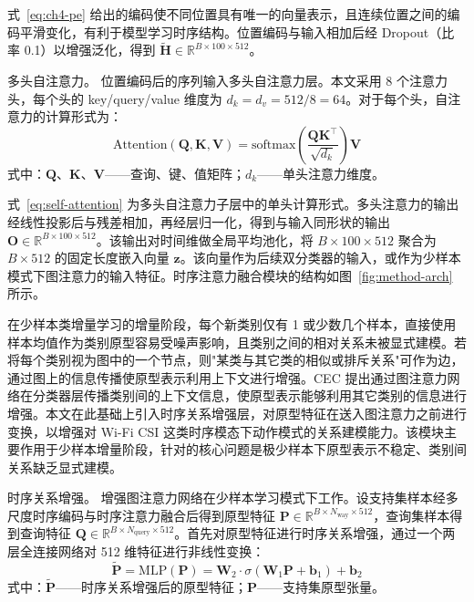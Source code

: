 式~\eqref{eq:ch4-pe} 给出的编码使不同位置具有唯一的向量表示，且连续位置之间的编码平滑变化，有利于模型学习时序结构。位置编码与输入相加后经 Dropout（比率 0.1）以增强泛化，得到 $\tilde{\mathbf{H}} \in \mathbb{R}^{B \times 100 \times 512}$。

多头自注意力。 位置编码后的序列输入多头自注意力层。本文采用 8 个注意力头，每个头的 key/query/value 维度为 $d_k = d_v = 512/8 = 64$。对于每个头，自注意力的计算形式为：
\begin{equation}\label{eq:self-attention}
  \mathrm{Attention}(\mathbf{Q}, \mathbf{K}, \mathbf{V}) = \mathrm{softmax}\left(\frac{\mathbf{Q}\mathbf{K}^\top}{\sqrt{d_k}}\right)\mathbf{V}
\end{equation}
\noindent 式中：$\mathbf{Q}$、$\mathbf{K}$、$\mathbf{V}$——查询、键、值矩阵；$d_k$——单头注意力维度。

式~\eqref{eq:self-attention} 为多头自注意力子层中的单头计算形式。多头注意力的输出经线性投影后与残差相加，再经层归一化，得到与输入同形状的输出 $\mathbf{O} \in \mathbb{R}^{B \times 100 \times 512}$。该输出对时间维做全局平均池化，将 $B \times 100 \times 512$ 聚合为 $B \times 512$ 的固定长度嵌入向量 $\mathbf{z}$。该向量作为后续双分类器的输入，或作为少样本模式下图注意力的输入特征。时序注意力融合模块的结构如图~\ref{fig:method-arch} 所示。


在少样本类增量学习的增量阶段，每个新类别仅有 1 或少数几个样本，直接使用样本均值作为类别原型容易受噪声影响，且类别之间的相对关系未被显式建模。若将每个类别视为图中的一个节点，则"某类与其它类的相似或排斥关系"可作为边，通过图上的信息传播使原型表示利用上下文进行增强。CEC\cite{zhang2021cec} 提出通过图注意力网络在分类器层传播类别间的上下文信息，使原型表示能够利用其它类别的信息进行增强。本文在此基础上引入时序关系增强层，对原型特征在送入图注意力之前进行变换，以增强对 Wi-Fi CSI 这类时序模态下动作模式的关系建模能力。该模块主要作用于少样本增量阶段，针对的核心问题是极少样本下原型表示不稳定、类别间关系缺乏显式建模。

时序关系增强。 增强图注意力网络在少样本学习模式下工作。设支持集样本经多尺度时序编码与时序注意力融合后得到原型特征 $\mathbf{P} \in \mathbb{R}^{B \times N_{\mathrm{way}} \times 512}$，查询集样本得到查询特征 $\mathbf{Q} \in \mathbb{R}^{B \times N_{\mathrm{query}} \times 512}$。首先对原型特征进行时序关系增强，通过一个两层全连接网络对 512 维特征进行非线性变换：
\begin{equation}\label{eq:ch4-mlp-proto}
  \tilde{\mathbf{P}} = \mathrm{MLP}(\mathbf{P}) = \mathbf{W}_2 \cdot \sigma(\mathbf{W}_1 \mathbf{P} + \mathbf{b}_1) + \mathbf{b}_2
\end{equation}
\noindent 式中：$\tilde{\mathbf{P}}$——时序关系增强后的原型特征；$\mathbf{P}$——支持集原型张量。

